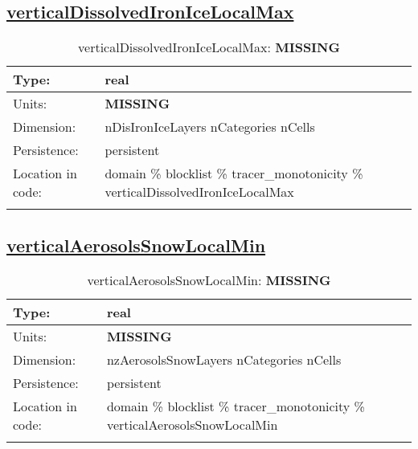 \subsection[verticalDissolvedIronIceLocalMax]{\hyperref[sec:var_tab_tracer_monotonicity]{verticalDissolvedIronIceLocalMax}}
\label{subsec:var_sec_tracer_monotonicity_verticalDissolvedIronIceLocalMax}
\begin{center}
\begin{longtable}{| p{2.0in} | p{4.0in} |}
        \hline 
        Type: & real \\
        \hline 
        Units: & {\bf \color{red} MISSING} \\
        \hline 
        Dimension: & nDisIronIceLayers nCategories nCells \\
        \hline 
        Persistence: & persistent \\
        \hline 
         Location in code: & domain \% blocklist \% tracer\_monotonicity \% verticalDissolvedIronIceLocalMax \\
         \hline 
    \caption{verticalDissolvedIronIceLocalMax: {\bf \color{red} MISSING}}
\end{longtable}
\end{center}
\subsection[verticalAerosolsSnowLocalMin]{\hyperref[sec:var_tab_tracer_monotonicity]{verticalAerosolsSnowLocalMin}}
\label{subsec:var_sec_tracer_monotonicity_verticalAerosolsSnowLocalMin}
\begin{center}
\begin{longtable}{| p{2.0in} | p{4.0in} |}
        \hline 
        Type: & real \\
        \hline 
        Units: & {\bf \color{red} MISSING} \\
        \hline 
        Dimension: & nzAerosolsSnowLayers nCategories nCells \\
        \hline 
        Persistence: & persistent \\
        \hline 
         Location in code: & domain \% blocklist \% tracer\_monotonicity \% verticalAerosolsSnowLocalMin \\
         \hline 
    \caption{verticalAerosolsSnowLocalMin: {\bf \color{red} MISSING}}
\end{longtable}
\end{center}
